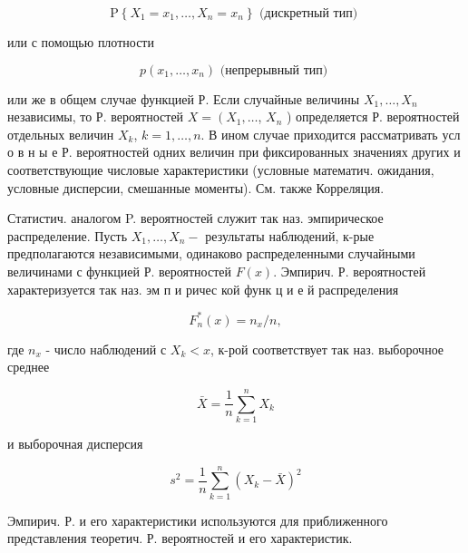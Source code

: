 \documentclass[10pt]{article}
\begin{document}
\[

\mathrm{P}\left\{X_{1}=x_{1}, \ldots, X_{n}=x_{n}\right\} \text { (дискретный тип) }

\]



или с помощью плотности



\[

p\left(x_{1}, \ldots, x_{n}\right) \text { (непрерывный тип) }

\]



или же в общем случае функцией Р. Если случайные величины $X_{1}, \ldots, X_{n}$ независимы, то Р. вероятностей $X=\left(X_{1}, \ldots\right.$, $X_{n}$ ) определяется Р. вероятностей отдельных величин $X_{k}$, $k=1, \ldots, n$. В ином случае приходится рассматривать усл о в н ы е Р. вероятностей одних величин при фиксированных значениях других и соответствующие числовые характеристики (условные математич. ожидания, условные дисперсии, смешанные моменты). См. также Корреляция.



Статистич. аналогом P. вероятностей служит так наз. эмпирическое распределение. Пусть $X_{1}, \ldots, X_{n}-$ результаты наблюдений, к-рые предполагаются независимыми, одинаково распределенными случайными величинами с функцией Р. вероятностей $F(x)$. Эмпирич. Р. вероятностей характеризуется так наз. эм п и ричес кой функ ц и е й распределения



\[

F_{n}^{*}(x)=n_{x} / n,

\]



где $n_{x}$ - число наблюдений с $X_{k}<x$, к-рой соответствует так наз. выборочное среднее



\[

\bar{X}=\frac{1}{n} \sum_{k=1}^{n} X_{k}

\]



и выборочная дисперсия



\[

s^{2}=\frac{1}{n} \sum_{k=1}^{n}\left(X_{k}-\bar{X}\right)^{2}

\]



Эмпирич. Р. и его характеристики используются для приближенного представления теоретич. Р. вероятностей и его характеристик.
\end{document}
